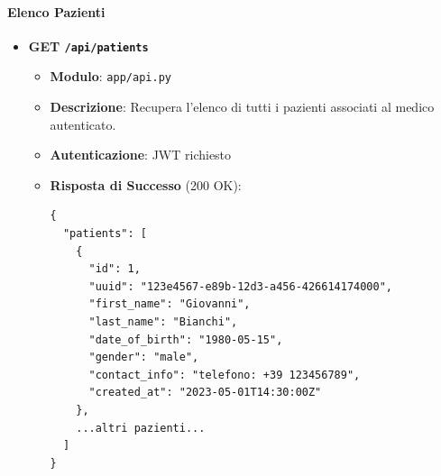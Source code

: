 \documentclass[12pt,a4paper,oneside]{report}
\begin{document}
\paragraph{Elenco Pazienti}
\begin{itemize}
    \item \textbf{GET \texttt{/api/patients}}
          \begin{itemize}
              \item \textbf{Modulo}: \texttt{app/api.py}
              \item \textbf{Descrizione}: Recupera l'elenco di tutti i pazienti associati al medico autenticato.
              \item \textbf{Autenticazione}: JWT richiesto
              \item \textbf{Risposta di Successo} (200 OK):
                    \begin{verbatim}
{
  "patients": [
    {
      "id": 1,
      "uuid": "123e4567-e89b-12d3-a456-426614174000",
      "first_name": "Giovanni",
      "last_name": "Bianchi",
      "date_of_birth": "1980-05-15",
      "gender": "male",
      "contact_info": "telefono: +39 123456789",
      "created_at": "2023-05-01T14:30:00Z"
    },
    ...altri pazienti...
  ]
}
        \end{verbatim}
          \end{itemize}
\end{itemize}
\end{document}
